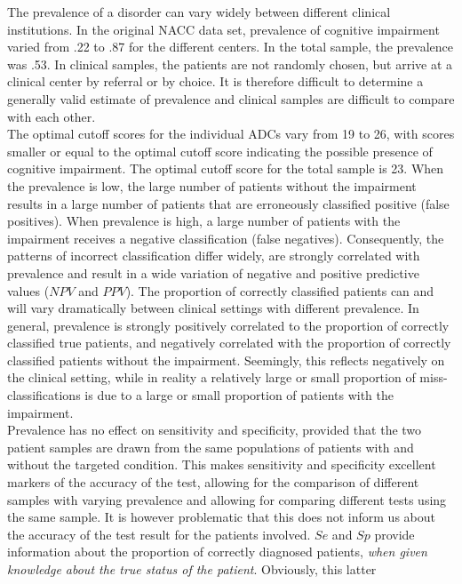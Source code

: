 \documentclass[
  nojss]{jss}
\begin{document}
The prevalence of a disorder can vary widely between different clinical
institutions. In the original NACC data set, prevalence of cognitive
impairment varied from .22 to .87 for the different centers. In the
total sample, the prevalence was .53. In clinical samples, the patients
are not randomly chosen, but arrive at a clinical center by referral or
by choice. It is therefore difficult to determine a generally valid
estimate of prevalence and clinical samples are difficult to compare
with each other.\\
The optimal cutoff scores for the individual ADCs vary from 19 to 26,
with scores smaller or equal to the optimal cutoff score indicating the
possible presence of cognitive impairment. The optimal cutoff score for
the total sample is 23. When the prevalence is low, the large number of
patients without the impairment results in a large number of patients
that are erroneously classified positive (false positives). When
prevalence is high, a large number of patients with the impairment
receives a negative classification (false negatives). Consequently, the
patterns of incorrect classification differ widely, are strongly
correlated with prevalence and result in a wide variation of negative
and positive predictive values (\(NPV\) and \(PPV\)). The proportion of
correctly classified patients can and will vary dramatically between
clinical settings with different prevalence. In general, prevalence is
strongly positively correlated to the proportion of correctly classified
true patients, and negatively correlated with the proportion of
correctly classified patients without the impairment. Seemingly, this
reflects negatively on the clinical setting, while in reality a
relatively large or small proportion of miss-classifications is due to a
large or small proportion of patients with the impairment.\\
Prevalence has no effect on sensitivity and specificity, provided that
the two patient samples are drawn from the same populations of patients
with and without the targeted condition. This makes sensitivity and
specificity excellent markers of the accuracy of the test, allowing for
the comparison of different samples with varying prevalence and allowing
for comparing different tests using the same sample. It is however
problematic that this does not inform us about the accuracy of the test
result for the patients involved. \(Se\) and \(Sp\) provide information
about the proportion of correctly diagnosed patients, \emph{when given
knowledge about the true status of the patient}. Obviously, this latter
\end{document}
